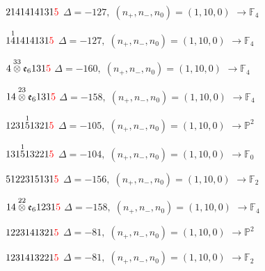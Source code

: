 \documentclass[10pt]{article}
\begin{document}
\smallskip

$2141414131\textcolor{red}{5}$ \quad $\Delta=-127,\; (n_+,n_-,n_0)=(1,10,0)$ \quad $\to \mathbb{F}_{4}$

\smallskip

$1\overset{1}{4}1414131\textcolor{red}{5}$ \quad $\Delta=-127,\; (n_+,n_-,n_0)=(1,10,0)$ \quad $\to \mathbb{F}_{4}$

\smallskip

$4\overset{33}{\otimes}\mathfrak{e}_6131\textcolor{red}{5}$ \quad $\Delta=-160,\; (n_+,n_-,n_0)=(1,10,0)$ \quad $\to \mathbb{F}_{4}$

\smallskip

$14\overset{23}{\otimes}\mathfrak{e}_6131\textcolor{red}{5}$ \quad $\Delta=-158,\; (n_+,n_-,n_0)=(1,10,0)$ \quad $\to \mathbb{F}_{4}$

\smallskip

$1231\overset{1}{5}1321\textcolor{red}{5}$ \quad $\Delta=-105,\; (n_+,n_-,n_0)=(1,10,0)$ \quad $\to \mathbb{P}^2$

\smallskip

$131\overset{1}{5}13221\textcolor{red}{5}$ \quad $\Delta=-104,\; (n_+,n_-,n_0)=(1,10,0)$ \quad $\to \mathbb{F}_{0}$

\smallskip

$5122315131\textcolor{red}{5}$ \quad $\Delta=-156,\; (n_+,n_-,n_0)=(1,10,0)$ \quad $\to \mathbb{F}_{2}$

\smallskip

$14\overset{22}{\otimes}\mathfrak{e}_61231\textcolor{red}{5}$ \quad $\Delta=-158,\; (n_+,n_-,n_0)=(1,10,0)$ \quad $\to \mathbb{F}_{4}$

\smallskip

$1223141321\textcolor{red}{5}$ \quad $\Delta=-81,\; (n_+,n_-,n_0)=(1,10,0)$ \quad $\to \mathbb{P}^2$

$1231413221\textcolor{red}{5}$ \quad $\Delta=-81,\; (n_+,n_-,n_0)=(1,10,0)$ \quad $\to \mathbb{F}_{2}$

\smallskip
\end{document}
